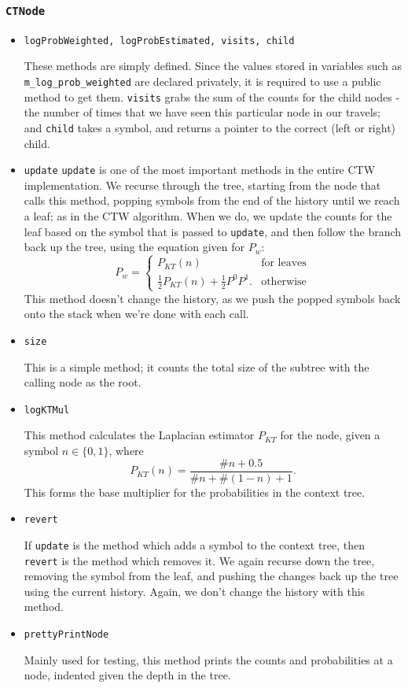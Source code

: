 \documentclass[pdftex,twoside,a4paper]{report}
\begin{document}
\subsubsection{\texttt{CTNode}}
\begin{itemize}
\item{\texttt{logProbWeighted, logProbEstimated, visits, child}}

    These methods are simply defined. Since the values stored in variables such as \texttt{m\_log\_prob\_weighted} are declared privately, it is required to use a public method to get them. \texttt{visits} grabs the sum of the counts for the child nodes - the number of times that we have seen this particular node in our travels; and \texttt{child} takes a symbol, and returns a pointer to the correct (left or right) child.

\item{\texttt{update}
    \texttt{update} is one of the most important methods in the entire CTW implementation. We recurse through the tree, starting from the node that calls this method, popping symbols from the end of the history until we reach a leaf; as in the CTW algorithm. When we do, we update the counts for the leaf based on the symbol that is passed to \texttt{update}, and then follow the branch back up the tree, using the equation given for $P_{w}$: \[ P_{w} = 
    \begin{cases}
    P_{KT}(n) &\text{for leaves}\\
    \frac{1}{2}P_{KT}(n) + \frac{1}{2}P^{0}P^{1}. &\text{otherwise}
	\end{cases}    
    \]
This method doesn't change the history, as we push the popped symbols back onto the stack when we're done with each call.
  }
\item{\texttt{size}
    
    This is a simple method; it counts the total size of the subtree with the calling node as the root. 
  }
\item{\texttt{logKTMul}
    
    This method calculates the Laplacian estimator $P_{KT}$ for the node, given a symbol $n \in \{0,1\}$, where \[ P_{KT}(n) = \frac{\#n + 0.5}{\#n + \#(1-n) + 1}.\] This forms the base multiplier for the probabilities in the context tree.
  }
\item{\texttt{revert}
    
    If \texttt{update} is the method which adds a symbol to the context tree, then \texttt{revert} is the method which removes it. We again recurse down the tree, removing the symbol from the leaf, and pushing the changes back up the tree using the current history. Again, we don't change the history with this method.
  }
\item{\texttt{prettyPrintNode}
    
    Mainly used for testing, this method prints the counts and probabilities at a node, indented given the depth in the tree.
  }
\end{itemize}
\end{document}
